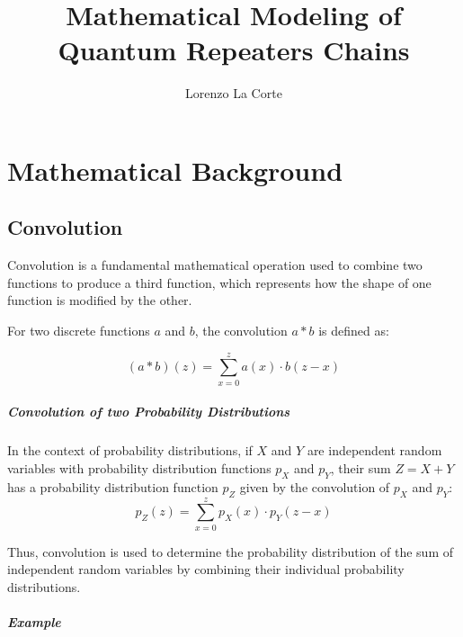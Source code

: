 \documentclass{masterthesis}
\begin{document}
\title{Mathematical Modeling of Quantum Repeaters Chains}

\author{Lorenzo La Corte}

\advisor{}

\examiner{}

\maketitle

\chapter*{Mathematical Background}

\section*{Convolution}

Convolution is a fundamental mathematical operation used to combine two functions to produce a third function, which represents how the shape of one function is modified by the other. 

For two discrete functions \(a\) and \(b\), the convolution \(a * b\) is defined as:

\begin{equation}
    (a * b)(z) = \sum_{x=0}^{z} a(x) \cdot b(z - x)
\end{equation}

\paragraph*{Convolution of two Probability Distributions}
In the context of probability distributions, if \(X\) and \(Y\) are independent random variables with probability distribution functions \(p_X\) and \(p_Y\), their sum \(Z = X + Y\) has a probability distribution function \(p_Z\) given by the convolution of \(p_X\) and \(p_Y\):
\begin{equation}\label{eq:convolution}
    p_Z(z) = \sum_{x=0}^{z} p_X(x) \cdot p_Y(z - x)
\end{equation}

Thus, convolution is used to determine the probability distribution of the sum of independent random variables by combining their individual probability distributions.

\paragraph*{Example} 
\end{document}
